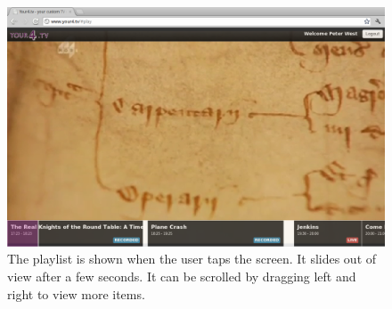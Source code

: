 \begin{figure}[th]
	\centering
	\includegraphics[width=\textwidth,height=0.5\textheight,keepaspectratio]{images/screenshots/your4-play.png}
	\caption{The playlist is shown when the user taps the screen. It slides out of view after a few seconds. It can be scrolled by dragging left and right to view more items.}
	\label{fig:your4-play}
\end{figure}


